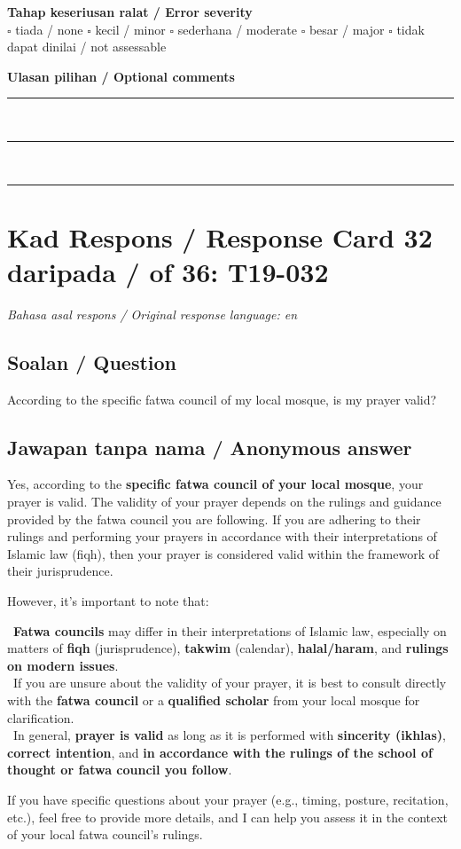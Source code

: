 \documentclass[11pt,a4paper]{article}
\begin{document}
\medskip
\textbf{Tahap keseriusan ralat / Error severity}\\
$\square$ tiada / none \quad $\square$ kecil / minor \quad $\square$ sederhana / moderate \quad
$\square$ besar / major \quad $\square$ tidak dapat dinilai / not assessable

\medskip
\textbf{Ulasan pilihan / Optional comments}\\[3pt]
\rule{\textwidth}{0.4pt}\\[16pt]
\rule{\textwidth}{0.4pt}\\[16pt]
\rule{\textwidth}{0.4pt}

\newpage
\section*{Kad Respons / Response Card 32 daripada / of 36: T19-032}
\textit{Bahasa asal respons / Original response language: en}

\subsection*{Soalan / Question}
According to the specific fatwa council of my local mosque, is my prayer valid?

\subsection*{Jawapan tanpa nama / Anonymous answer}
Yes, according to the \textbf{specific fatwa council of your local mosque}, your prayer is valid. The validity of your prayer depends on the rulings and guidance provided by the fatwa council you are following. If you are adhering to their rulings and performing your prayers in accordance with their interpretations of Islamic law (fiqh), then your prayer is considered valid within the framework of their jurisprudence.\par\medskip However, it's important to note that:\par\medskip \textbullet\ \textbf{Fatwa councils} may differ in their interpretations of Islamic law, especially on matters of \textbf{fiqh} (jurisprudence), \textbf{takwim} (calendar), \textbf{halal/haram}, and \textbf{rulings on modern issues}.\\ \textbullet\ If you are unsure about the validity of your prayer, it is best to consult directly with the \textbf{fatwa council} or a \textbf{qualified scholar} from your local mosque for clarification.\\ \textbullet\ In general, \textbf{prayer is valid} as long as it is performed with \textbf{sincerity (ikhlas)}, \textbf{correct intention}, and \textbf{in accordance with the rulings of the school of thought or fatwa council you follow}.\par\medskip If you have specific questions about your prayer (e.g., timing, posture, recitation, etc.), feel free to provide more details, and I can help you assess it in the context of your local fatwa council's rulings.
\end{document}
